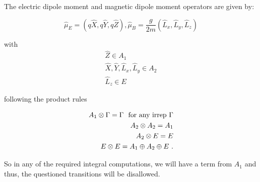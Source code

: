 \begin{alphaparts}
    \begin{figure}[ht]
        \centering
        \begin{subfigure}[b]{0.15\textwidth}
        \end{subfigure}
        \begin{subfigure}[b]{0.15\textwidth}
        \end{subfigure}
        \begin{subfigure}[b]{0.15\textwidth}
        \end{subfigure}
        \begin{subfigure}[b]{0.15\textwidth}
        \end{subfigure}
        \begin{subfigure}[b]{0.15\textwidth}
        \end{subfigure}
    \end{figure}

    \questionpart 
    The electric dipole moment and magnetic dipole moment operators are given by:
    
    \begin{equation}
        \hat \mu_E = (q\hat X, q\hat Y, q\hat Z), \hat \mu_B = \frac{g}{2m} (\hat L_x, \hat L_y, \hat L_z)
    \end{equation}

    with 
    \begin{align}
        \hat Z \in A_1 \\
        \hat X, \hat Y, \hat L_x, \hat L_y \in A_2 \\
        \hat L_z \in E
    \end{align}

    following the product rules

    \begin{align}
        A_1 \otimes \Gamma = \Gamma \textnormal{ ~for any irrep } \Gamma \\
        A_2 \otimes A_2 = A_1 \\
        A_2 \otimes E = E \\
        E \otimes E = A_1 \oplus A_2 \oplus E~.
    \end{align}

    So in any of the required integral computations, we will have a term from $A_1$ and thus,
    the questioned transitions will be disallowed.

\end{alphaparts}